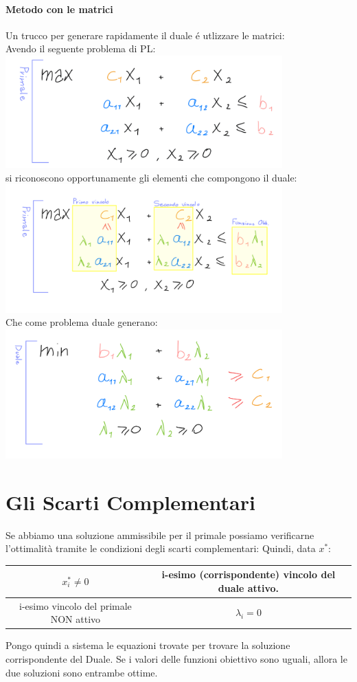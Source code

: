\documentclass[12pt, a4paper, openany]{book}
\begin{document}
\paragraph{Metodo con le matrici}
Un trucco per generare rapidamente il duale é utlizzare le matrici:\\
Avendo il seguente problema di PL:\\
\includegraphics[width=0.8\textwidth]{dualita-cheatsheet-0.jpeg}\\
si riconoscono opportunamente gli elementi che compongono il duale:\\
\includegraphics[width=0.8\textwidth]{dualita-cheatsheet-1.jpeg}\\
Che come problema duale generano: \\
\includegraphics[width=0.8\textwidth]{dualita-cheatsheet-2.jpeg}


\section{Gli Scarti Complementari}
Se abbiamo una soluzione ammissibile per il primale possiamo verificarne l'ottimalità tramite le condizioni degli scarti complementari:
Quindi, data $x^*$:
\begin{tabular}{|c|c|}                                                            
\hline
$x_i^* \neq 0$ & i-esimo (corrispondente) vincolo del duale attivo. \\
\hline
i-esimo vincolo del primale NON attivo & $\lambda_i = 0$\\
\hline
\end{tabular}
Pongo quindi a sistema le equazioni trovate per trovare la soluzione corrispondente del Duale.
Se i valori delle funzioni obiettivo sono uguali, allora le due soluzioni sono entrambe ottime.
	
\end{document}
